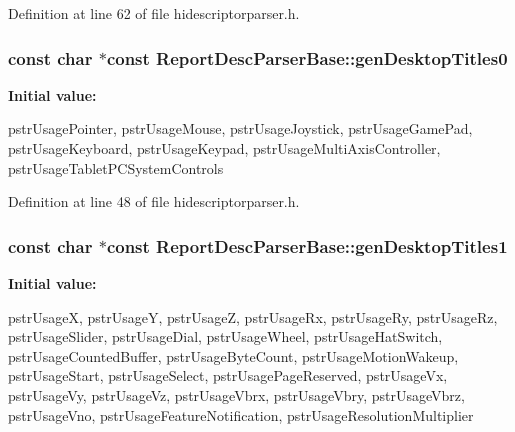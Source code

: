 \-Definition at line 62 of file hidescriptorparser.\-h.

\hypertarget{class_report_desc_parser_base_a3021443d9320135788844c166240149f}{
\subsubsection[{gen\-Desktop\-Titles0}]{\setlength{\rightskip}{0pt plus 5cm}const char $\ast$const {\bf \-Report\-Desc\-Parser\-Base\-::gen\-Desktop\-Titles0}}}\label{class_report_desc_parser_base_a3021443d9320135788844c166240149f}
{\bfseries \-Initial value\-:}
\begin{DoxyCode}
 {
        pstrUsagePointer,
        pstrUsageMouse,
        pstrUsageJoystick,
        pstrUsageGamePad,
        pstrUsageKeyboard,
        pstrUsageKeypad,
        pstrUsageMultiAxisController,
        pstrUsageTabletPCSystemControls

}
\end{DoxyCode}


\-Definition at line 48 of file hidescriptorparser.\-h.

\hypertarget{class_report_desc_parser_base_a0cca04764c613389545ab02cce068367}{
\subsubsection[{gen\-Desktop\-Titles1}]{\setlength{\rightskip}{0pt plus 5cm}const char $\ast$const {\bf \-Report\-Desc\-Parser\-Base\-::gen\-Desktop\-Titles1}}}\label{class_report_desc_parser_base_a0cca04764c613389545ab02cce068367}
{\bfseries \-Initial value\-:}
\begin{DoxyCode}
 {
        pstrUsageX,
        pstrUsageY,
        pstrUsageZ,
        pstrUsageRx,
        pstrUsageRy,
        pstrUsageRz,
        pstrUsageSlider,
        pstrUsageDial,
        pstrUsageWheel,
        pstrUsageHatSwitch,
        pstrUsageCountedBuffer,
        pstrUsageByteCount,
        pstrUsageMotionWakeup,
        pstrUsageStart,
        pstrUsageSelect,
        pstrUsagePageReserved,
        pstrUsageVx,
        pstrUsageVy,
        pstrUsageVz,
        pstrUsageVbrx,
        pstrUsageVbry,
        pstrUsageVbrz,
        pstrUsageVno,
        pstrUsageFeatureNotification,
        pstrUsageResolutionMultiplier
}
\end{DoxyCode}


